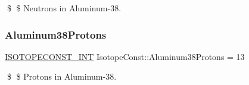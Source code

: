 \$ \$ Neutrons in Aluminum-\/38. \mbox{\label{group___isotope_const-_aluminum-_al38_ga9a0679e7ab745298be83c3b07cb16698}} 
\subsubsection{\texorpdfstring{Aluminum38\+Protons}{Aluminum38Protons}}
{\footnotesize\ttfamily \mbox{\hyperlink{group___isotope_const-_macros_ga5f18360b3e99483a35c32d789e62621c}{I\+S\+O\+T\+O\+P\+E\+C\+O\+N\+S\+T\+\_\+\+I\+NT}} Isotope\+Const\+::\+Aluminum38\+Protons = 13}

\$ \$ Protons in Aluminum-\/38. 